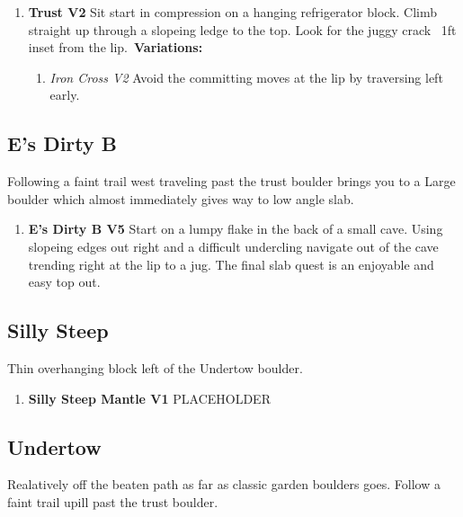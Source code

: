 \begin{enumerate}[resume]
	\item\label{rt:Trust} \colorbox{green!20}{\textbf{Trust V2      } }
	\newline Sit start in compression on a hanging refrigerator block. Climb straight up through a slopeing ledge to the top. Look for the juggy crack ~1ft inset from the lip.\
	\newline \textbf{Variations:}
	\begin{enumerate}
		\item\label{vr:Iron Cross} \colorbox{green!20}{\emph{Iron Cross V2   }  }
		\newline Avoid the committing moves at the lip by traversing left early.\
	\end{enumerate}
\end{enumerate}
\subsection*{E's Dirty B}\label{bf:E's Dirty B}
Following a faint trail west traveling past the trust boulder brings you to a Large boulder which almost immediately gives way to low angle slab.

\begin{enumerate}[resume]
	\item\label{rt:E's Dirty B} \colorbox{RoyalBlue!20}{\textbf{E's Dirty B V5     } }
	\newline Start on a lumpy flake in the back of a small cave. Using slopeing edges out right and a difficult undercling navigate out of the cave trending right at the lip to a jug. The final slab quest is an enjoyable and easy top out.\
\end{enumerate}
\subsection*{Silly Steep}\label{bf:Silly Steep}
Thin overhanging block left of the Undertow boulder.

\begin{enumerate}[resume]
	\item\label{rt:Silly Steep Mantle} \colorbox{green!20}{\textbf{Silly Steep Mantle V1  } }
	\newline PLACEHOLDER\
\end{enumerate}
\subsection*{Undertow}\label{bf:Undertow}
Realatively off the beaten path as far as classic garden boulders goes. Follow a faint trail upill past the trust boulder.

